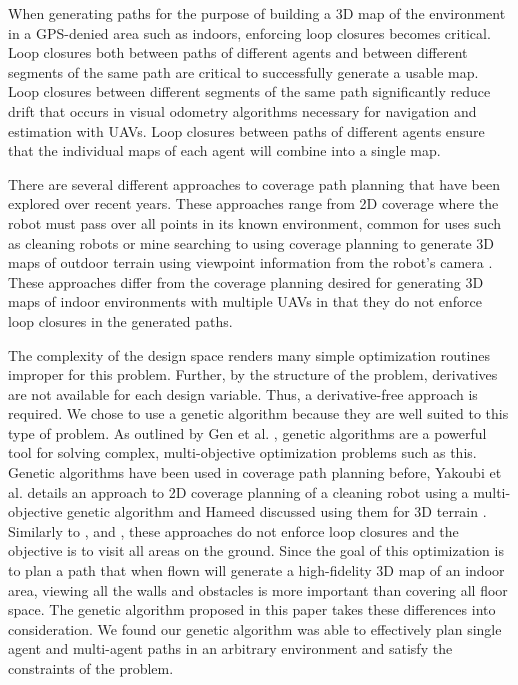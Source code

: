 \documentclass[letterpaper, 10 pt, conference]{ieeeconf}  %
\begin{document}
When generating paths for the purpose of building a 3D map of the environment in a GPS-denied area such as indoors, enforcing loop closures becomes critical. Loop closures both between paths of different agents and between different segments of the same path are critical to successfully generate a usable map. Loop closures between different segments of the same path significantly reduce drift that occurs in visual odometry algorithms necessary for navigation and estimation with UAVs. Loop closures between paths of different agents ensure that the individual maps of each agent will combine into a single map.

There are several different approaches to coverage path planning that have been explored over recent years. These approaches range from 2D coverage where the robot must pass over all points in its known environment, common for uses such as cleaning robots or mine searching \cite{Choset2001} to using coverage planning to generate 3D maps of outdoor terrain using viewpoint information from the robot's camera \cite{Bircher2016}. These approaches differ from the coverage planning desired for generating 3D maps of indoor environments with multiple UAVs in that they do not enforce loop closures in the generated paths.

The complexity of the design space renders many simple optimization routines improper for this problem. Further, by the structure of the problem, derivatives are not available for each design variable. Thus, a derivative-free approach is required. We chose to use a genetic algorithm because they are well suited to this type of problem. As outlined by Gen et al. \cite{Gen2000}, genetic algorithms are a powerful tool for solving complex, multi-objective optimization problems such as this. Genetic algorithms have been used in coverage path planning before, Yakoubi et al. details an approach to 2D coverage planning of a cleaning robot using a multi-objective genetic algorithm \cite{Yakoubi2016} and Hameed discussed using them for 3D terrain \cite{Hameed2014}. Similarly to \cite{Choset2001}, and \cite{Bircher2016}, these approaches do not enforce loop closures and the objective is to visit all areas on the ground. Since the goal of this optimization is to plan a path that when flown will generate a high-fidelity 3D map of an indoor area, viewing all the walls and obstacles is more important than covering all floor space. The genetic algorithm proposed in this paper takes these differences into consideration. We found our genetic algorithm was able to effectively plan single agent and multi-agent paths in an arbitrary environment and satisfy the constraints of the problem.
\end{document}
